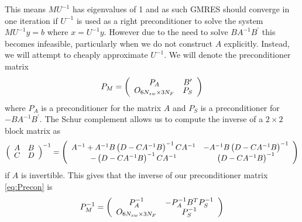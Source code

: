 This means $MU^{-1}$ has eigenvalues of 1 and as such GMRES should converge in one iteration \cite{Rostami2019FastBiofluids} if $U^{-1}$ is used as a right preconditioner to solve the system $MU^{-1}y = b$ where $x = U^{-1}y$. However due to the need to solve $BA^{-1}B^\prime$ this becomes infeasible, particularly when we do not construct $A$ explicitly.  Instead, we will attempt to cheaply approximate $U^{-1}$. We will denote the preconditioner matrix 
\begin{equation}
\def\arraystretch{0.8}
    P_M = \left(\begin{array}{cc}
        P_A & B^\prime \\
        O_{6N_{sw}\times3N_F} & P_S
    \end{array}\right)
    \label{eq:Precon}
\end{equation}
where $P_A$ is a preconditioner for the matrix $A$ and $P_S$ is a preconditioner for $-BA^{-1}B^\prime$. The Schur complement \cite{Zhang2005TheApplications,Lu2002InversesMatrices} allows us to compute the inverse of a $2 \times 2$ block matrix as 
\begin{equation*}
\def\arraystretch{0.8}
    \left(\begin{array}{cc}
        A & B \\
        C & D
    \end{array}\right)^{-1} = \left(\begin{array}{cc}
A^{-1}+A^{-1} B\left(D-C A^{-1} B\right)^{-1} C A^{-1} & -A^{-1} B\left(D-C A^{-1} B\right)^{-1} \\
-\left(D-C A^{-1} B\right)^{-1} C A^{-1} & \left(D-C A^{-1} B\right)^{-1}
\end{array}\right) 
\end{equation*}
if $A$ is invertible. This gives that the inverse of our preconditioner matrix \cref{eq:Precon} is
\begin{equation*}
\def\arraystretch{0.8}
        P_M^{-1} = \left(\begin{array}{cc}
        P_A^{-1} & -P_A^{-1} B^T P_S^{-1} \\
        O_{6N_{sw}\times3N_F} & P_S^{-1}
    \end{array}\right)
\end{equation*}

